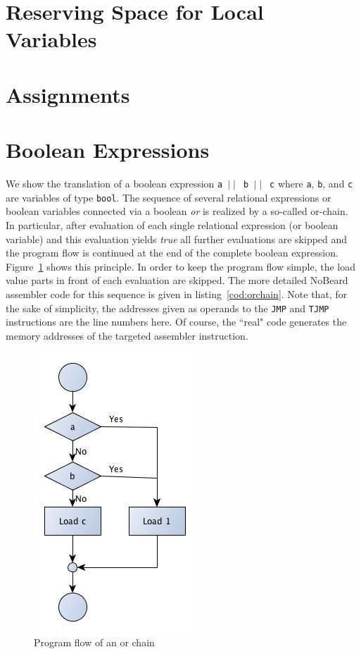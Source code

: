\documentclass[11pt]{report}
\newcommand{\leongage}{NoBeard}
\begin{document}
\section{Reserving Space for Local Variables}

\section{Assignments}

\section{Boolean Expressions}
We show the translation of a boolean expression {\tt a $\mid \mid$ b $\mid \mid$ c} where {\tt a}, {\tt b}, and {\tt c} are variables of type {\tt bool}. The sequence of several relational expressions or boolean variables connected via a boolean {\em or} is realized by a so-called or-chain. In particular, after evaluation of each single relational expression (or boolean variable) and this evaluation yields {\em true} all further evaluations are skipped and the program flow is continued at the end of the complete boolean expression. Figure~\ref{fig:orchain} shows this principle. In order to keep the program flow simple, the load value parts in front of each evaluation are skipped. The more detailed \leongage{} assembler code for this sequence is given in listing~\ref{cod:orchain}. Note that, for the sake of simplicity, the addresses given as operands to the {\tt JMP} and {\tt TJMP} instructions are the line numbers here. Of course, the ``real" code generates the memory addresses of the targeted assembler instruction.

\begin{figure}
\begin{center}
\includegraphics[scale=.5]{images/OrChain.png}
\end{center}
\caption{Program flow of an or chain}
\label{fig:orchain}
\end{figure}
\end{document}
